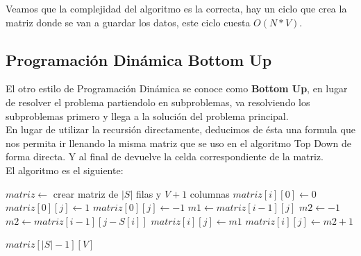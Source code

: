 \documentclass[a4paper]{article}
\begin{document}
Veamos que la complejidad del algoritmo es la correcta, hay un ciclo que crea la matriz donde se van a guardar los datos, este ciclo cuesta $O(N*V)$.

\subsection{Programaci\'on Din\'amica Bottom Up}

El otro estilo de Programación Dinámica se conoce como \textbf{Bottom Up}, en lugar de resolver el problema partiendolo en subproblemas, va resolviendo los subproblemas primero y llega a la solución del problema principal.
\\
En lugar de utilizar la recursión directamente, deducimos de ésta una formula que nos permita ir llenando la misma matriz que se uso en el algoritmo Top Down de forma directa. Y al final de devuelve la celda correspondiente de la matriz.
\\
El algoritmo es el siguiente:

\begin{algorithm}
\begin{algorithmic}
		\State $matriz \gets$ crear matriz de $|S|$ filas y $V+1$ columnas
			\State $matriz[i][0] \gets 0$
		\EndFor
				\State $matriz[0][j] \gets 1$
			\Else
				\State $matriz[0][j] \gets -1$
			\EndIf
		\EndFor
			\State $m1 \gets matriz[i-1][j]$			
				\State $m2 \gets -1$
			\Else
				\State $m2 \gets matriz[i-1][j - S[i]]$
			\EndIf
				\State $matriz[i][j] \gets m1$ 
			\Else
				\State $matriz[i][j] \gets m2 + 1$ 
			\EndIf
			\EndFor
		\EndFor
		
		\State \Return $matriz[|S|-1][V]$
	\EndProcedure
\end{algorithmic}
\end{algorithm}
\end{document}
